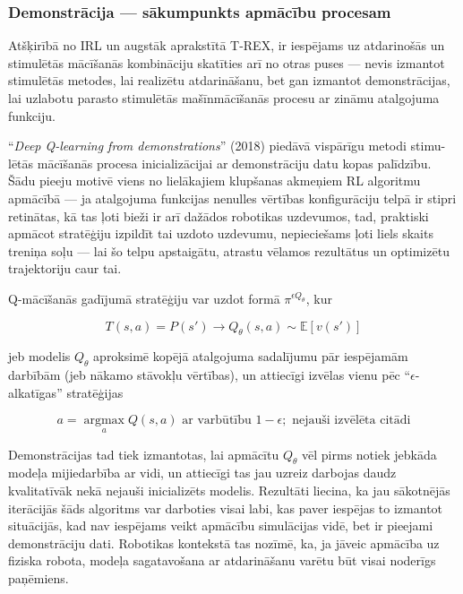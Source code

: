 \documentclass[12pt, a4paper]{article}
\numberwithin{equation}{section} %
\begin{document}
\subsubsection{Demonstrācija --- sākumpunkts apmācību procesam}

Atšķirībā no IRL un augstāk aprakstītā T-REX, ir iespējams uz atdarinošās un stimulētās mācīšanās kombināciju skatīties arī no otras puses --- nevis izmantot stimulētās metodes, lai realizētu atdarināšanu, bet gan izmantot demonstrācijas, lai uzlabotu parasto stimulētās mašīnmācīšanās procesu ar zināmu atalgojuma funkciju.

``\textit{Deep Q-learning from demonstrations}'' \cite{hester2018deep} (2018) piedāvā vispārīgu metodi stimu-lētās mācīšanās procesa inicializācijai ar demonstrāciju datu kopas palīdzību. Šādu pieeju motivē viens no lielākajiem klupšanas akmeņiem RL algoritmu apmācībā --- ja atalgojuma funkcijas nenulles vērtības konfigurāciju telpā ir stipri retinātas, kā tas ļoti bieži ir arī dažādos robotikas uzdevumos, tad, praktiski apmācot stratēģiju izpildīt tai uzdoto uzdevumu, nepieciešams ļoti liels skaits treniņa soļu --- lai šo telpu apstaigātu, atrastu vēlamos rezultātus un optimizētu trajektoriju caur tai.

Q-mācīšanās gadījumā stratēģiju var uzdot formā $\pi^{\epsilon Q_{\theta}}$, kur

\begin{equation}
    T(s,a) = P(s') \rightarrow Q_{\theta}(s,a) \sim \mathbb{E}[v(s')] 
\end{equation}

jeb modelis $Q_{\theta}$ aproksimē kopējā atalgojuma sadalījumu pār iespējamām darbībām (jeb nākamo stāvokļu vērtības), un attiecīgi izvēlas vienu pēc ``$\epsilon$-alkatīgas'' stratēģijas

\begin{equation}
    a = \operatorname*{argmax}_a Q(s,a) \text{ ar varbūtību } 1-\epsilon; \text{ nejauši izvēlēta citādi}
\end{equation}

Demonstrācijas tad tiek izmantotas, lai apmācītu $Q_{\theta}$ vēl pirms notiek jebkāda modeļa mijiedarbība ar vidi, un attiecīgi tas jau uzreiz darbojas daudz kvalitatīvāk nekā nejauši inicializēts modelis. Rezultāti liecina, ka jau sākotnējās iterācijās šāds algoritms var darboties visai labi, kas paver iespējas to izmantot situācijās, kad nav iespējams veikt apmācību simulācijas vidē, bet ir pieejami demonstrāciju dati. Robotikas kontekstā tas nozīmē, ka, ja jāveic apmācība uz fiziska robota, modeļa sagatavošana ar atdarināšanu varētu būt visai noderīgs paņēmiens.
\end{document}
